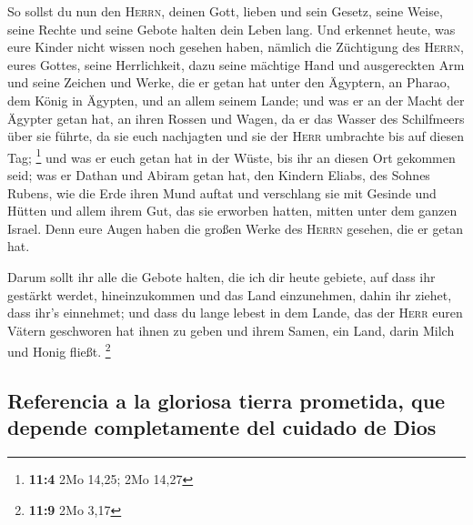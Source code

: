  So sollst du nun den \textsc{Herrn}, deinen Gott, lieben
und sein Gesetz, seine Weise, seine Rechte und seine Gebote halten dein
Leben lang.  Und erkennet heute, was eure Kinder nicht
wissen noch gesehen haben, nämlich die Züchtigung des \textsc{Herrn},
eures Gottes, seine Herrlichkeit, dazu seine mächtige Hand und
ausgereckten Arm  und seine Zeichen und Werke, die er
getan hat unter den Ägyptern, an Pharao, dem König in Ägypten, und an
allem seinem Lande;  und was er an der Macht der Ägypter
getan hat, an ihren Rossen und Wagen, da er das Wasser des Schilfmeers
über sie führte, da sie euch nachjagten und sie der \textsc{Herr}
umbrachte bis auf diesen Tag; \footnote{\textbf{11:4} 2Mo 14,25; 2Mo
  14,27}  und was er euch getan hat in der Wüste, bis ihr
an diesen Ort gekommen seid;  was er Dathan und Abiram
getan hat, den Kindern Eliabs, des Sohnes Rubens, wie die Erde ihren
Mund auftat und verschlang sie mit Gesinde und Hütten und allem ihrem
Gut, das sie erworben hatten, mitten unter dem ganzen Israel.
 Denn eure Augen haben die großen Werke des \textsc{Herrn}
gesehen, die er getan hat.

 Darum sollt ihr alle die Gebote halten, die ich dir heute
gebiete, auf dass ihr gestärkt werdet, hineinzukommen und das Land
einzunehmen, dahin ihr ziehet, dass ihr's einnehmet;  und
dass du lange lebest in dem Lande, das der \textsc{Herr} euren Vätern
geschworen hat ihnen zu geben und ihrem Samen, ein Land, darin Milch und
Honig fließt. \footnote{\textbf{11:9} 2Mo 3,17}

\hypertarget{referencia-a-la-gloriosa-tierra-prometida-que-depende-completamente-del-cuidado-de-dios}{%
\subsection{Referencia a la gloriosa tierra prometida, que depende
completamente del cuidado de
Dios}\label{referencia-a-la-gloriosa-tierra-prometida-que-depende-completamente-del-cuidado-de-dios}}

